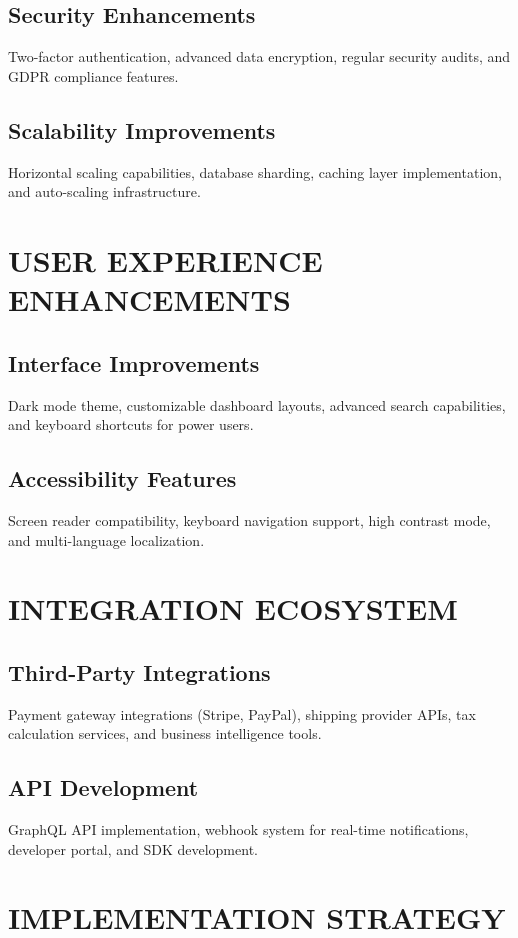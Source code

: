 \subsection{Security Enhancements}
Two-factor authentication, advanced data encryption, regular security audits, and GDPR compliance features.

\subsection{Scalability Improvements}
Horizontal scaling capabilities, database sharding, caching layer implementation, and auto-scaling infrastructure.

\section{USER EXPERIENCE ENHANCEMENTS}

\subsection{Interface Improvements}
Dark mode theme, customizable dashboard layouts, advanced search capabilities, and keyboard shortcuts for power users.

\subsection{Accessibility Features}
Screen reader compatibility, keyboard navigation support, high contrast mode, and multi-language localization.

\section{INTEGRATION ECOSYSTEM}

\subsection{Third-Party Integrations}
Payment gateway integrations (Stripe, PayPal), shipping provider APIs, tax calculation services, and business intelligence tools.

\subsection{API Development}
GraphQL API implementation, webhook system for real-time notifications, developer portal, and SDK development.

\section{IMPLEMENTATION STRATEGY}


